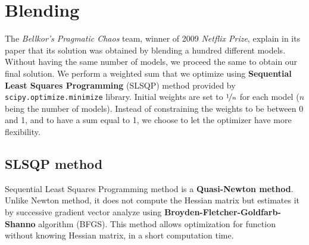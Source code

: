 \documentclass[10pt,conference,compsocconf]{IEEEtran}
\begin{document}
\section{Blending}
\label{sec:blending}

The \textit{Bellkor's Pragmatic Chaos} team, winner of 2009 \textit{Netflix Prize}, explain in its paper that its solution was obtained by blending a hundred different models. \cite{BellKore_netflix} Without having the same number of models, we proceed the same to obtain our final solution. We perform a weighted sum that we optimize using \textbf{Sequential Least Squares Programming} (SLSQP) method provided by \texttt{scipy.optimize.minimize} library. Initial weights are set to $\nicefrac{1}{n}$ for each model ($n$ being the number of models). Instead of constraining the weights to be between 0 and 1, and to have a sum equal to 1, we choose to let the optimizer have more flexibility.

\subsection{SLSQP method}
\label{SLSQP}
Sequential Least Squares Programming method is a \textbf{Quasi-Newton method}. Unlike Newton method, it does not compute the Hessian matrix but estimates it by successive gradient vector analyze \cite{wiki:quasi_newton} using \textbf{Broyden-Fletcher-Goldfarb-Shanno} algorithm (BFGS). This method allows optimization for function without knowing Hessian matrix, in a short computation time.
\end{document}
